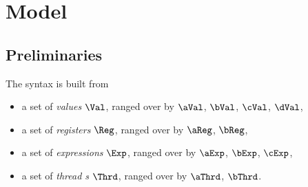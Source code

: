 


\section{Model}
\label{sec:model}

\subsection{Preliminaries}
\label{sec:prelim}
The syntax is built from
\begin{itemize}
\item a set of \emph{values} $\Val$, ranged over by
  $\aVal$, $\bVal$, $\cVal$, $\dVal$,
\item a set of \emph{registers} $\Reg$, ranged over by
  $\aReg$, $\bReg$,
\item a set of \emph{expressions} $\Exp$, ranged over by
  $\aExp$, $\bExp$,  $\cExp$,
\item a set of \emph{thread \ID{}s} $\Thrd$, ranged over by
  $\aThrd$, $\bThrd$.
\end{itemize}

